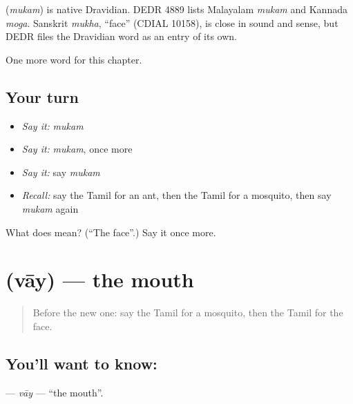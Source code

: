 \begin{cousinweb}
\textbf{} (\emph{mukam}) is native Dravidian. DEDR 4889 lists Malayalam \emph{mukam} and Kannada \emph{moga}. Sanskrit \emph{mukha}, \textquotedblleft{}face\textquotedblright{} (CDIAL 10158), is close in sound and sense, but DEDR files the Dravidian word as an entry of its own.
\end{cousinweb}

\begin{grammarlens}[title={What you've built}]
One more word for this chapter.
\end{grammarlens}

\subsection*{Your turn}
\begin{itemize}
\raggedright
  \item \emph{Say it:} \emph{mukam}
  \item \emph{Say it:} \emph{mukam}, once more
  \item \emph{Say it:} say \emph{mukam}
  \item \emph{Recall:} say the Tamil for an ant, then the Tamil for a mosquito, then say \emph{mukam} again
\end{itemize}

\begin{tcolorbox}[breakable,colback=teal!4,colframe=teal!35!black,title={Before you move on}]
What does  mean? (\textquotedblleft{}The face\textquotedblright{}.) Say it once more.
\end{tcolorbox}
\section[\texorpdfstring{\ta{வாய்} (vāy)}{வாய் (vāy)}]{ (vāy) — the mouth}

\label{lesson:TA-C132-vay}



\begin{quote}
Before the new one: say the Tamil for a mosquito, then the Tamil for the face.
\end{quote}

\subsection*{You'll want to know: }
\textbf{} — \emph{vāy} — \textquotedblleft{}the mouth\textquotedblright{}.

